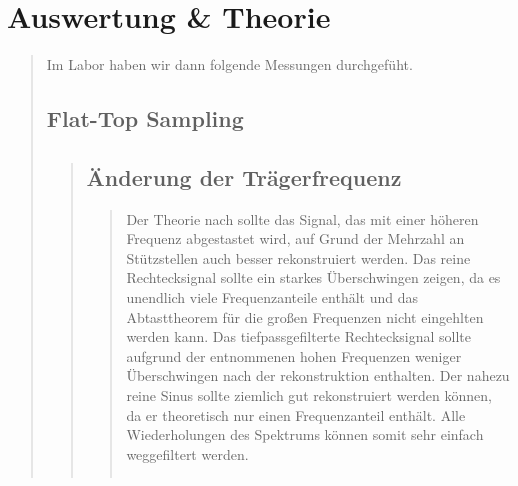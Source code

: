 \section{Auswertung \& Theorie}
\begin{quote}
    
    Im Labor haben wir dann folgende Messungen durchgefüht.
    
    
    \subsection{Flat-Top Sampling}
    \begin{quote}
        
        \subsection{Änderung der Trägerfrequenz}
        \begin{quote}
            
            Der Theorie nach sollte das Signal, das mit einer höheren Frequenz abgestastet wird, auf Grund der Mehrzahl
            an Stützstellen auch besser rekonstruiert werden.
            Das reine Rechtecksignal sollte ein starkes Überschwingen zeigen, da es unendlich viele Frequenzanteile
            enthält und das Abtasttheorem für die großen Frequenzen nicht eingehlten werden kann.
            Das tiefpassgefilterte Rechtecksignal sollte aufgrund der entnommenen hohen Frequenzen weniger Überschwingen
            nach der rekonstruktion enthalten.
            Der nahezu reine Sinus sollte ziemlich gut rekonstruiert werden können, da er theoretisch nur einen
            Frequenzanteil enthält. Alle Wiederholungen des Spektrums können somit sehr einfach weggefiltert werden.
            
            
            \begin{center}
            \begin{tabular}{ll}
            

\end{tabular}
\end{center}
\end{quote}
\end{quote}
\end{quote}
